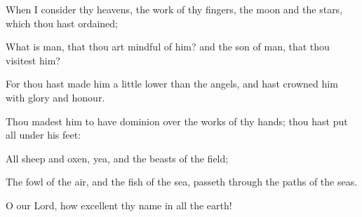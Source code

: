 {\Q {}When I
consider thy
heavens, the
work of thy
fingers, the
moon and the
stars, which thou hast
ordained;


\par }{\Q {}What is
man, that thou art
mindful of him? and the
son of
man, that thou
visitest him?


\par }{\Q {}For thou hast made him a
little
lower than the
angels, and hast
crowned him with
glory and
honour.


\par }{\Q {}Thou madest him to have
dominion over the
works of thy
hands; thou hast
put all
{} under his
feet:


\par }{\Q {}All
sheep and
oxen, yea, and the
beasts of the
field;


\par }{\Q {}The
fowl of the
air, and the
fish of the
sea,
{} passeth
through the
paths of the
seas.


\par }{\Q {}O
{} our
Lord, how
excellent
{} thy
name in all the
earth!




\par }
